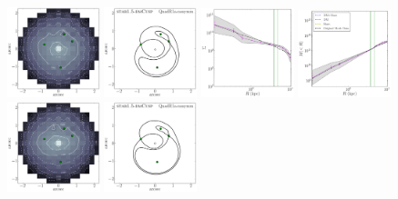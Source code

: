 \documentclass[galley,usenatbib]{mn2e}
\begin{document}
\begin{figure}
\includegraphics[width=0.24\textwidth]{BCQuadR1a-nosymm_Tms-appendix-a.pdf}
\includegraphics[width=0.24\textwidth]{BCQuadR1a-nosymm_Tms-appendix-b.pdf}
\includegraphics[width=0.24\textwidth]{BCQuadR1a-nosymm_Tms-appendix-c.pdf}
\includegraphics[width=0.24\textwidth]{BCQuadR1a-nosymm_Tms-appendix-d.pdf}\\
%
\includegraphics[width=0.24\textwidth]{BCQuadR1a-nosymm_Tms-appendix-a-1.pdf}
\includegraphics[width=0.24\textwidth]{BCQuadR1a-nosymm_Tms-appendix-b-1.pdf}

\end{figure}
\end{document}
